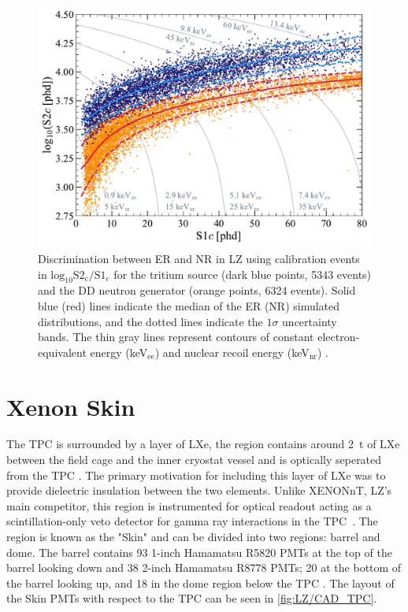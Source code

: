 \begin{figure}[!ht]
    \centering
    \includegraphics[width=0.7\linewidth]{figures/LZ/SR1WS_calOnly_0629.pdf}
    \caption[Discrimination between ER and NR in LZ using calibration events.]{Discrimination between ER and NR in LZ using calibration events in $\text{log}_{10}\text{S2}_{\text{c}}/\text{S1}_{\text{c}}$ for the tritium source (dark blue points, 5343 events) and the DD neutron generator (orange points, 6324 events). Solid blue (red) lines indicate the median of the ER (NR) simulated distributions, and the dotted lines indicate the $1\sigma$ uncertainty bands. The thin gray lines represent contours of constant electron-equivalent energy (keV$_{\text{ee}}$) and nuclear recoil energy (keV$_{\text{nr}}$) \cite{LZ:2022lsv}.}
    \label{fig:LZ/NRERBandExample}
\end{figure}

\section{Xenon Skin}\label{sec:LZ/Skin}
The TPC is surrounded by a layer of LXe, the region contains around 2~t of LXe between the field cage and the inner cryostat vessel and is optically seperated from the TPC \cite{LZNIMA}. The primary motivation for including this layer of LXe was to provide dielectric insulation between the two elements. Unlike XENONnT, LZ's main competitor, this region is instrumented for optical readout acting as a scintillation-only veto detector for gamma ray interactions in the TPC~\cite{XENON:2024wpa}. The region is known as the "Skin" and can be divided into two regions: barrel and dome. The barrel contains 93 1-inch Hamamatsu R5820 PMTs at the top of the barrel looking down and 38 2-inch Hamamatsu R8778 PMTs; 20 at the bottom of the barrel looking up, and 18 in the dome region below the TPC \cite{LZNIMA}. The layout of the Skin PMTs with respect to the TPC can be seen in \autoref{fig:LZ/CAD_TPC}.

